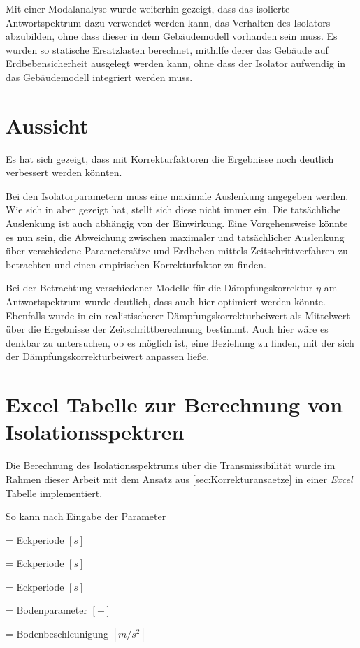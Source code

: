 Mit einer Modalanalyse wurde weiterhin gezeigt, dass das isolierte Antwortspektrum dazu verwendet werden kann, das Verhalten des Isolators abzubilden, ohne dass dieser in dem Gebäudemodell vorhanden sein muss.
Es wurden so statische Ersatzlasten berechnet, mithilfe derer das Gebäude auf Erdbebensicherheit ausgelegt werden kann, ohne dass der Isolator aufwendig in das Gebäudemodell integriert werden muss.

\section{Aussicht}

Es hat sich gezeigt, dass mit Korrekturfaktoren die Ergebnisse noch deutlich verbessert werden könnten.

Bei den Isolatorparametern muss eine maximale Auslenkung angegeben werden. Wie sich in \cite{Isemann} aber gezeigt hat, stellt sich diese nicht immer ein. Die tatsächliche Auslenkung ist auch abhängig von der Einwirkung.
Eine Vorgehensweise könnte es nun sein, die Abweichung zwischen maximaler und tatsächlicher Auslenkung über verschiedene Parametersätze und Erdbeben mittels Zeitschrittverfahren zu betrachten und einen empirischen Korrekturfaktor zu finden.

Bei der Betrachtung verschiedener Modelle für die Dämpfungskorrektur $\eta$ am Antwortspektrum wurde deutlich, dass auch hier optimiert werden könnte. Ebenfalls wurde in \cite{Isemann} ein realistischerer Dämpfungskorrekturbeiwert als Mittelwert über die Ergebnisse der Zeitschrittberechnung bestimmt. Auch hier wäre es denkbar zu untersuchen, ob es möglich ist, eine Beziehung zu finden, mit der sich der Dämpfungskorrekturbeiwert anpassen ließe.

\section{Excel Tabelle zur Berechnung von Isolationsspektren}

Die Berechnung des Isolationsspektrums über die Transmissibilität wurde im Rahmen dieser Arbeit mit dem Ansatz aus \cref{sec:Korrekturansaetze} in einer \emph{Excel} Tabelle implementiert.

So kann nach Eingabe der Parameter 

  = Eckperiode $[s]$ \par
{}  = Eckperiode $[s]$ \par
{}  = Eckperiode $[s]$ \par
{}    = Bodenparameter $[-]$ \par
{}  = Bodenbeschleunigung $[m/s^2]$ \par

